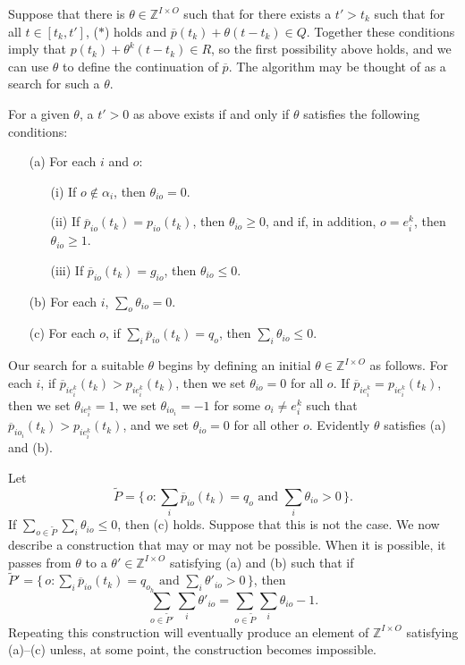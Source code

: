 \documentclass[12pt, A4paper]{article}
\theoremstyle{definition}
\newcommand{\In}{\mathbb{Z}}
\newcommand{\tP}{{\tilde P}}
\newcommand{\barp}{\overline{p}}
\begin{document}
Suppose that there is $\theta \in \In^{I \times O}$ such that for there exists a $t' > t_k$ such that for all $t \in [t_k,t']$, ($*$) holds and $\barp(t_k) + \theta(t - t_k) \in Q$.  Together these conditions imply that $p(t_k) + \theta^k(t - t_k) \in R$, so the first possibility above holds, and we can use $\theta$ to define the continuation of $\barp$.  The algorithm may be thought of as a search for such a $\theta$.

For a given $\theta$, a $t' > 0$ as above exists if and only if $\theta$ satisfies the following conditions:
\begin{enumerate} 
  \item[(a)] For each $i$ and $o$:
    \begin{enumerate}
      \item[(i)] If $o \notin \alpha_i$, then $\theta_{io} = 0$.
      \item[(ii)] If $\barp_{io}(t_k) = p_{io}(t_k)$, then $\theta_{io} \ge 0$, and if, in addition, $o = e^k_i$, then $\theta_{io} \ge 1$.
      \item[(iii)] If $\barp_{io}(t_k) = g_{io}$, then $\theta_{io} \le 0$.
    \end{enumerate}
  \item[(b)] For each $i$, $\sum_o \theta_{io} = 0$.
  \item[(c)] For each $o$, if $\sum_i \barp_{io}(t_k) = q_o$, then $\sum_i \theta_{io} \le 0$.
\end{enumerate}


Our search for a suitable $\theta$ begins by defining an initial $\theta \in \In^{I \times O}$ as follows.  For each $i$,  if $\barp_{ie^k_i}(t_k) > p_{ie^k_i}(t_k)$, then we set 
$\theta_{io} = 0$ for all $o$.  If $\barp_{ie^k_i} = p_{ie^k_i}(t_k)$, then we set
$\theta_{ie^k_i} = 1$, we set $\theta_{io_i} = -1$ for some $o_i \ne e^k_i$ such that $\barp_{io_i}(t_k) > p_{ie^k_i}(t_k)$, and we set $\theta_{io} = 0$ for all other $o$.  Evidently  $\theta$ satisfies (a) and (b).

Let $$\tP = \{\, o : \text{$\sum_i \barp_{io}(t_k) = q_{o}$ and $\sum_i \theta_{io} > 0$} \,\}.$$  If $\sum_{o \in \tP} \sum_i \theta_{io} \le 0$, then (c) holds.  Suppose that this is not the case.  We now describe a construction that may or may not be possible.  When it is possible, it passes from $\theta$ to a $\theta' \in \In^{I \times O}$ satisfying (a) and (b) such that if $\tP' = \{\, o : \text{$\sum_i \barp_{io}(t_k) = q_{o_h}$ and $\sum_i \theta'_{io} > 0$} \,\}$, then $$\sum_{o \in \tP'} \sum_i \theta'_{io} = \sum_{o \in \tP} \sum_i \theta_{io} - 1.$$
Repeating this construction will eventually produce an element of $\In^{I \times O}$ satisfying (a)--(c) unless, at some point, the construction becomes impossible.
\end{document}
